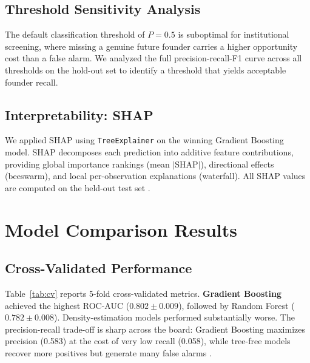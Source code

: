 \documentclass[10pt,twocolumn]{article}
\begin{document}
\subsection{Threshold Sensitivity Analysis}

The default classification threshold of $P = 0.5$ is suboptimal for
institutional screening, where missing a genuine future founder carries a higher
opportunity cost than a false alarm. We analyzed the full precision-recall-F1
curve across all thresholds on the hold-out set to identify a threshold that
yields acceptable founder recall.

\subsection{Interpretability: SHAP}

We applied SHAP \cite{lundberg2017} using \texttt{TreeExplainer} on the winning
Gradient Boosting model. SHAP decomposes each prediction into additive feature
contributions, providing global importance rankings (mean $|\text{SHAP}|$),
directional effects (beeswarm), and local per-observation explanations
(waterfall). All SHAP values are computed on the held-out test set \cite{shannaq2025}.

\section{Model Comparison Results}
\label{sec:results}

\subsection{Cross-Validated Performance}

Table~\ref{tab:cv} reports 5-fold cross-validated metrics. \textbf{Gradient
Boosting} achieved the highest ROC-AUC ($0.802 \pm 0.009$), followed by
Random Forest ($0.782 \pm 0.008$). Density-estimation models performed
substantially worse. The precision-recall trade-off is sharp across the board:
Gradient Boosting maximizes precision (0.583) at the cost of very low recall
(0.058), while tree-free models recover more positives but generate many false
alarms \cite{naveenkumar2026}.
\end{document}
